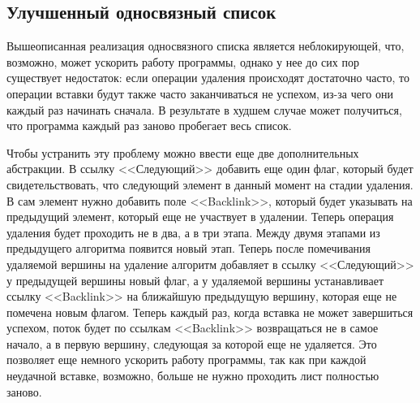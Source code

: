 \documentclass[12pt]{article}
\begin{document}
{			\subsection{Улучшенный односвязный список}
				\par Вышеописанная реализация односвязного списка является неблокирующей, что, возможно, может ускорить работу программы, однако у нее до сих пор существует недостаток: если операции удаления происходят достаточно часто, то операции вставки будут также часто заканчиваться не успехом, из-за чего они каждый раз начинать сначала. В результате в худшем случае может получиться, что программа каждый раз заново пробегает весь список.
				\par Чтобы устранить эту проблему можно ввести еще две дополнительных абстракции. В ссылку <<Следующий>> добавить еще один флаг, который будет свидетельствовать, что следующий элемент в данный момент на стадии удаления. В сам элемент нужно добавить поле <<Backlink>>, который будет указывать на предыдущий элемент, который еще не участвует в удалении. Теперь операция удаления будет проходить не в два, а в три этапа. Между двумя этапами из предыдущего алгоритма появится новый этап. Теперь после помечивания удаляемой вершины на удаление алгоритм добавляет в ссылку <<Следующий>> у предыдущей вершины новый флаг, а у удаляемой вершины устанавливает ссылку <<Backlink>> на ближайшую предыдущую вершину, которая еще не помечена новым флагом. Теперь каждый раз, когда вставка не может завершиться успехом, поток будет по ссылкам <<Backlink>> возвращаться не в самое начало, а в первую вершину, следующая за которой еще не удаляется. Это позволяет еще немного ускорить работу программы, так как при каждой неудачной вставке, возможно, больше не нужно проходить лист полностью заново.
}
\end{document}
